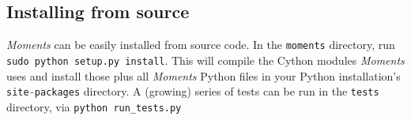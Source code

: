 \documentclass[12pt]{article}
\makeatletter
\newcommand{\py}[1]{\lstinline[language=Python, showstringspaces=False]@#1@}
\makeatother
\begin{document}
\subsection{Installing from source}

\textit{Moments} can be easily installed from source code.
In the \py{moments} directory, run \py{sudo python setup.py install}.
This will compile the Cython modules \textit{Moments} uses and install those plus all \textit{Moments} Python files in your Python installation's \py{site-packages} directory.
A (growing) series of tests can be run in the \py{tests} directory, via \py{python run_tests.py}



\end{document}
